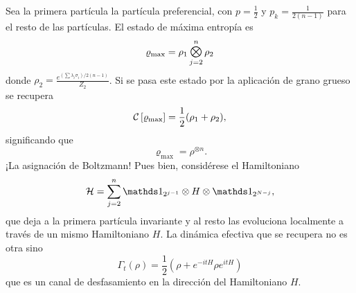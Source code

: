 Sea la primera partícula la partícula preferencial, con $p=\frac{1}{2}$ y $p_{k}=\frac{1}{2(n-1)}$ para el resto de las partículas. El estado de máxima entropía es
\begin{equation*}
    \varrho_{\max}=\rho_{1}\Motimes_{j=2}^{n}\rho_{2}
\end{equation*}
donde $\rho_{2}=\frac{e^{(\sum \lambda_{i}\sigma_{i})/2(n-1)}}{Z_{2}}$. Si se pasa este estado por la aplicación de grano grueso se recupera
\begin{equation*}
    \mathcal{C}\left[\varrho_{\max}\right]=\frac{1}{2}(\rho_{1}+\rho_{2}),
\end{equation*}
significando que 
\begin{equation*}
    \varrho_{\max}=\rho^{\otimes n}.
\end{equation*}
¡La asignación de Boltzmann! Pues bien, considérese el Hamiltoniano
\begin{equation*}
    \mcH=\sum_{j=2}^{n}\Id_{2^{j-1}}\otimes H \otimes \Id_{2^{N-j}},
\end{equation*}
que deja a la primera partícula invariante y al resto las evoluciona localmente a través de un mismo Hamiltoniano $H$. La dinámica efectiva que se recupera no es otra sino
\begin{equation*}
    \Gamma_{t}(\rho)=\frac{1}{2}(\rho+e^{-itH}\rho e^{itH})
\end{equation*}
que es un canal de desfasamiento en la dirección del Hamiltoniano $H$.
